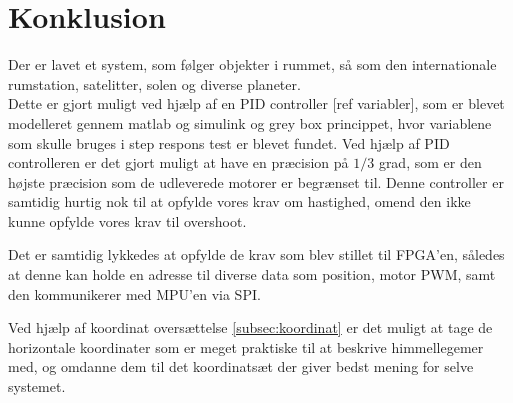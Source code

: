\section{Konklusion}
Der er lavet et system, som følger objekter i rummet, så som den internationale rumstation, satelitter, solen og diverse planeter.\\
Dette er gjort muligt ved hjælp af en PID controller [ref variabler], som er blevet modelleret gennem matlab og simulink og grey box princippet, hvor variablene som skulle bruges i step respons test er blevet fundet. Ved hjælp af PID controlleren er det gjort muligt at have en præcision på $1/3$ grad, som er den højste præcision som de udleverede motorer er begrænset til. Denne controller er samtidig hurtig nok til at opfylde vores krav om hastighed, omend den ikke kunne opfylde vores krav til overshoot.

Det er samtidig lykkedes at opfylde de krav som blev stillet til FPGA'en, således at denne kan holde en adresse til diverse data som position, motor PWM, samt den kommunikerer med MPU'en via SPI.

Ved hjælp af koordinat oversættelse \ref{subsec:koordinat} er det muligt at tage de horizontale koordinater som er meget praktiske til at beskrive himmellegemer med, og omdanne dem til det koordinatsæt der giver bedst mening for selve systemet.